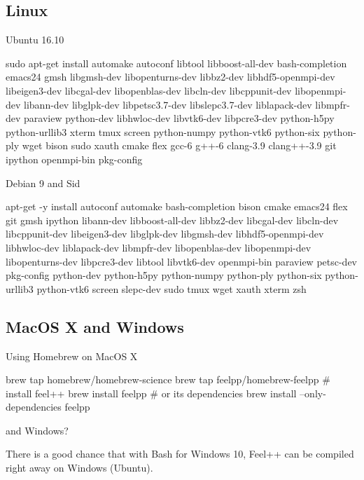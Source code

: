 \subsection{Linux}

\begin{frame}[fragile]{Ubuntu 16.10}
  \begin{bashcode}
    sudo apt-get install automake autoconf libtool libboost-all-dev
    bash-completion emacs24 gmsh libgmsh-dev libopenturns-dev
    libbz2-dev libhdf5-openmpi-dev libeigen3-dev libcgal-dev
    libopenblas-dev libcln-dev libcppunit-dev libopenmpi-dev
    libann-dev libglpk-dev libpetsc3.7-dev libslepc3.7-dev
    liblapack-dev libmpfr-dev paraview python-dev libhwloc-dev
    libvtk6-dev libpcre3-dev python-h5py python-urllib3 xterm tmux
    screen python-numpy python-vtk6 python-six python-ply wget bison
    sudo xauth cmake flex gcc-6 g++-6 clang-3.9 clang++-3.9 git
    ipython openmpi-bin pkg-config
  \end{bashcode}
\end{frame}

\begin{frame}[fragile]{Debian 9 and Sid}
  \begin{bashcode}
    apt-get -y install
    autoconf automake bash-completion bison cmake emacs24
    flex git gmsh ipython libann-dev libboost-all-dev
    libbz2-dev libcgal-dev libcln-dev libcppunit-dev
    libeigen3-dev libglpk-dev libgmsh-dev
    libhdf5-openmpi-dev libhwloc-dev liblapack-dev
    libmpfr-dev libopenblas-dev libopenmpi-dev
    libopenturns-dev libpcre3-dev libtool libvtk6-dev
    openmpi-bin paraview petsc-dev pkg-config python-dev
    python-h5py python-numpy python-ply python-six
    python-urllib3 python-vtk6 screen slepc-dev sudo
    tmux wget xauth xterm zsh
  \end{bashcode}
\end{frame}

\subsection{MacOS X and Windows}


\begin{frame}[fragile]{Using Homebrew on MacOS X}
  \begin{bashcode}
    brew tap homebrew/homebrew-science
    brew tap feelpp/homebrew-feelpp
    # install feel++
    brew install feelpp
    # or  its dependencies
    brew install --only-dependencies feelpp
  \end{bashcode}
\end{frame}

\begin{frame}{and Windows?}

  \begin{center}
  There is a good chance that with \alert{Bash for Windows 10}, Feel++ can be
  compiled right away on Windows (Ubuntu).
\end{center}
\end{frame}





